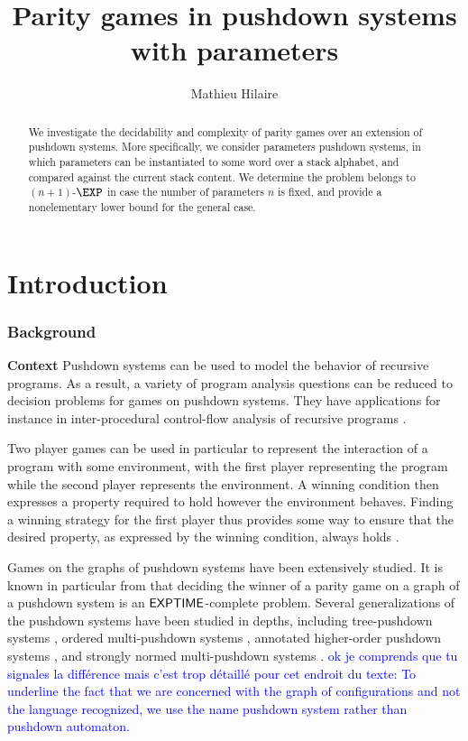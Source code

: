 \documentclass[a4paper,UKenglish,cleveref, autoref, thm-restate]{lipics-v2021}
\title{Parity games in pushdown systems with parameters}
\author{Mathieu Hilaire}{Université Paris-Saclay,
CNRS,
ENS Paris-Saclay,
LMF,
Gif-sur-Yvette, France
}{hilaire@lsv.fr}{}{This work was partly done while the author was supported by the 
Agence Nationale de la Recherche grant no.  ANR-17-CE40-0010.}
\begin{document}
\maketitle


\begin{abstract}
	We investigate the decidability and complexity of
	parity games over an extension of pushdown systems.
	More specifically, we consider parameters pushdown systems, in
	which parameters can be instantiated to some word over a stack alphabet,
	and compared against the current stack content.
	We determine the problem
	belongs to $(n+1)$-$\EXP$ in case the number of parameters
$n$ is fixed, and provide a nonelementary lower bound for the general case. 
\end{abstract}

\section{Introduction}

\subsubsection*{Background}


{\bf Context} Pushdown systems can be used to model the behavior of recursive programs.
As a result, a variety of 
 program analysis questions can be reduced to decision problems for games on pushdown systems.
They have applications for instance in inter-procedural control-flow analysis of recursive programs \cite{esparza1999automata, reps2005weighted}.





Two player games can be used in particular to
 represent the
interaction of a program with some environment, with the first player representing the program while the second player represents the environment. A winning condition then expresses a property required to hold however the environment behaves. Finding a winning strategy for the first player
thus provides some way 
 to ensure that the desired 
property, as expressed by the winning condition,
always holds \cite{arnold2003games}.


Games on the graphs of pushdown systems have been extensively studied.
It is known in particular from \cite{walukiewicz1996pushdown} that deciding the winner of a parity game on a graph of a pushdown system is an ${\sf EXPTIME}$-complete problem.
Several generalizations of the pushdown systems 
have been studied in depths, including
tree-pushdown systems \cite{guessarian1983pushdown}, ordered
multi-pushdown systems \cite{breveglieri1996multi, atig2012model}, annotated higher-order pushdown systems \cite{maslov1976multilevel, broadbent2012saturation}, and
strongly normed multi-pushdown systems \cite{czerwinski2012reachability}.
\textcolor{blue}{ok je comprends que tu signales la différence mais c'est trop détaillé pour cet endroit du texte: To underline the fact that we are concerned with the graph of configurations and not the language recognized, we use the name pushdown system rather than pushdown automaton.}
\end{document}
